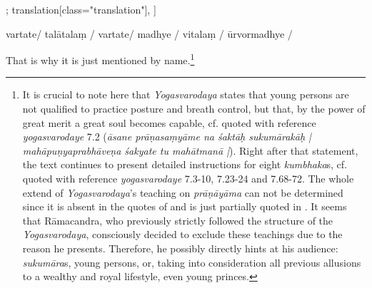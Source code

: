 \begin{alignment}[
  texts=edition[class="edition"];
  translation[class="translation"],
  ]
\begin{edition}
\begin{prose}[p32_01]
{  
  }
vartate/
talātalaṃ
/
vartate/
madhye
/
vitalaṃ
/ 
ūrvormadhye
/
      \end{prose}
  \end{edition}
  \begin{translation}
    \begin{tlate}[p31_02]
      \noindent
      That is why it is just mentioned by name.\footnote{It is crucial to note here that \textit{Yogasvarodaya} states that young persons are not qualified to practice posture and breath control, but that, by the power of great merit a great soul becomes capable, cf.  quoted with reference \textit{yogasvarodaye} 7.2 (\textit{āsane prāṇasaṃyāme na śaktāḥ sukumārakāḥ | mahāpuṇyaprabhāveṇa śakyate tu mahātmanā |}). Right after that statement, the text continues to present detailed instructions for eight \textit{kumbhaka}s, cf.  quoted with reference \textit{yogasvarodaye} 7.3-10, 7.23-24 and 7.68-72. The whole extend of \textit{Yogasvarodaya}'s teaching on \textit{prāṇāyāma} can not be determined since it is absent in the quotes of  and is just partially quoted in . It seems that Rāmacandra, who previously strictly followed the structure of the \textit{Yogasvarodaya}, consciously decided to exclude these teachings due to the reason he presents. Therefore, he possibly directly hints at his audience: \textit{sukumāra}s, young persons, or, taking into consideration all previous allusions to a wealthy and royal lifestyle, even young princes.}
      

\end{tlate}
\end{translation}
\end{alignment}
